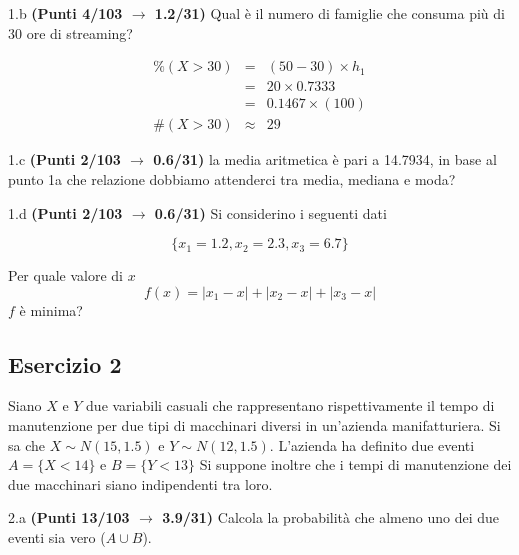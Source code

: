 \documentclass[
  11pt,
]{book}
\theoremstyle{mytheoremstyle}
\theoremstyle{mydefstyle}
\newenvironment{sol}
  {
  \begin{tcolorbox}[enhanced,breakable,arc=0.1mm,boxrule=1pt,colback=white,colframe=iblue,
  title=\bf \fontfamily{lmss}\selectfont \hspace{.5 cm} Soluzione,drop fuzzy shadow]

}{
\end{tcolorbox}
  }
\begin{document}
1.b \textbf{(Punti 4/103 \(\rightarrow\) 1.2/31)} Qual è il numero di famiglie che consuma più di 30 ore di streaming?

\begin{sol}
\begin{eqnarray*}
     \%(X> 30 ) &=&( 50 - 30 )\times h_1 \\
              &=& 20 \times  0.7333 \\
              &=&  0.1467 \times(100)\\
     \#(X> 30 ) &\approx& 29 
         \end{eqnarray*}

\end{sol}

1.c \textbf{(Punti 2/103 \(\rightarrow\) 0.6/31)} la media aritmetica è pari a 14.7934, in base al punto 1a che relazione dobbiamo attenderci tra media, mediana e moda?

1.d \textbf{(Punti 2/103 \(\rightarrow\) 0.6/31)} Si considerino i seguenti dati

\[
\{x_1=1.2,x_2=2.3,x_3=6.7\}
\]

Per quale valore di \(x\)
\[
f(x)=|x_1-x|+|x_2-x|+|x_3-x|
\]
\(f\) è minima?

\subsection{Esercizio 2}\label{esercizio-2-32}

Siano \(X\) e \(Y\) due variabili casuali che rappresentano rispettivamente il tempo di manutenzione per due tipi di macchinari diversi in un'azienda manifatturiera. Si sa che \(X\sim N(15,1.5)\) e \(Y\sim N(12,1.5)\). L'azienda ha definito due eventi \(A=\{X< 14\}\) e \(B=\{Y<13\}\)
Si suppone inoltre che i tempi di manutenzione dei due macchinari siano indipendenti tra loro.

2.a \textbf{(Punti 13/103 \(\rightarrow\) 3.9/31)} Calcola la probabilità che almeno uno dei due eventi sia vero (\(A \cup B\)).
\end{document}
